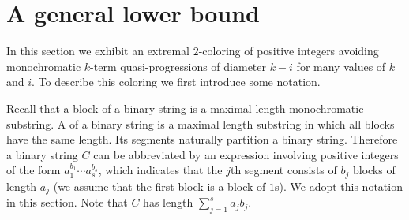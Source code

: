 \section{A general lower bound\label{sec:QP lower bound}}

In this section we exhibit an extremal $2$-coloring of positive integers avoiding monochromatic $k$-term quasi-progressions of diameter $k-i$ for many values of $k$ and $i$. To describe this coloring we first introduce some notation.

Recall that a block of a binary string is a maximal length monochromatic substring. A  of a binary string is a maximal length substring in which all blocks have the same length. Its segments naturally partition a binary string. Therefore a binary string $C$ can be abbreviated by an expression involving positive integers of the form $a_1^{b_1}\cdots a_s^{b_s}$, which indicates that the $j$th segment consists of $b_j$ blocks of length $a_j$ (we assume that the first block is a block of $1$s). We adopt this notation in this section. Note that $C$ has length $\sum_{j=1}^s a_j b_j$. 

